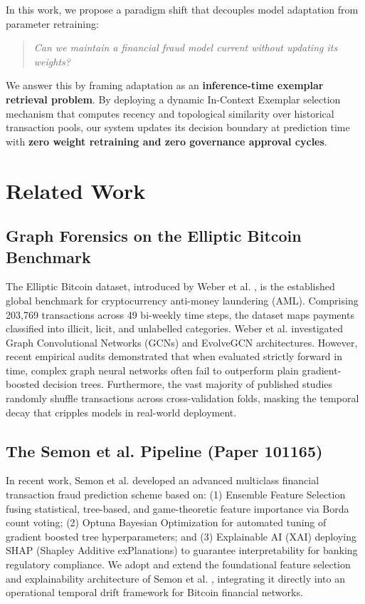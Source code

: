 \documentclass[conference]{IEEEtran}
\begin{document}
In this work, we propose a paradigm shift that decouples model adaptation from parameter retraining:
\begin{quote}
\textit{Can we maintain a financial fraud model current without updating its weights?}
\end{quote}
We answer this by framing adaptation as an \textbf{inference-time exemplar retrieval problem}. By deploying a dynamic In-Context Exemplar selection mechanism that computes recency and topological similarity over historical transaction pools, our system updates its decision boundary at prediction time with \textbf{zero weight retraining and zero governance approval cycles}.

\section{Related Work}
\subsection{Graph Forensics on the Elliptic Bitcoin Benchmark}
The Elliptic Bitcoin dataset, introduced by Weber et al. \cite{weber2019}, is the established global benchmark for cryptocurrency anti-money laundering (AML). Comprising 203,769 transactions across 49 bi-weekly time steps, the dataset maps payments classified into illicit, licit, and unlabelled categories. Weber et al. investigated Graph Convolutional Networks (GCNs) and EvolveGCN architectures. However, recent empirical audits \cite{ghosh2023} demonstrated that when evaluated strictly forward in time, complex graph neural networks often fail to outperform plain gradient-boosted decision trees. Furthermore, the vast majority of published studies randomly shuffle transactions across cross-validation folds, masking the temporal decay that cripples models in real-world deployment.

\subsection{The Semon et al. Pipeline (Paper 101165)}
In recent work, Semon et al. \cite{semon2026} developed an advanced multiclass financial transaction fraud prediction scheme based on: (1) Ensemble Feature Selection fusing statistical, tree-based, and game-theoretic feature importance via Borda count voting; (2) Optuna Bayesian Optimization for automated tuning of gradient boosted tree hyperparameters; and (3) Explainable AI (XAI) deploying SHAP (Shapley Additive exPlanations) to guarantee interpretability for banking regulatory compliance. We adopt and extend the foundational feature selection and explainability architecture of Semon et al. \cite{semon2026}, integrating it directly into an operational temporal drift framework for Bitcoin financial networks.
\end{document}
